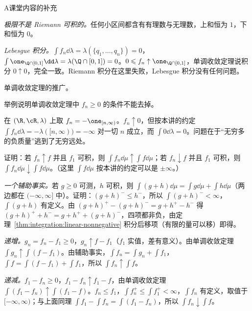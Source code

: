 \begin{exercises}{A}{课堂内容的补充}
\begin{solution}
\emph{极限不是 Riemann 可积的。}任何小区间都含有有理数与无理数，上和恒为 $1$，下和恒为 $0$。

\emph{Lebesgue 积分。}$\int f_n\dd\lambda=\lambda(\{q_1,\dots,q_n\})=0$，$\int\one_{\Q\cap[0,1]}\dd\lambda=\lambda(\Q\cap[0,1])=0$。$0\leqslant f_n\uparrow\one_{\Q\cap[0,1]}$，单调收敛定理说积分 $0\uparrow0$，完全一致。Riemann 积分在这里失败，Lebesgue 积分没有任何问题。
\end{solution}

\item\label{ex:integration:A5} 单调收敛定理的推广。
\begin{questions}
\item 举例说明单调收敛定理中 $f_n\geqslant0$ 的条件不能去掉。
\begin{solution}
在 $(\R,\cR,\lambda)$ 上取 $f_n=-\one_{[n,\infty)}$。$f_n\uparrow0$，但按本讲的约定 $\int f_n\dd\lambda=-\lambda([n,\infty))=-\infty$ 对一切 $n$ 成立，而 $\int0\dd\lambda=0$。问题在于“无穷多的负质量”逃到了无穷远处。
\end{solution}
\item 证明：若 $f_n\uparrow f$ 并且 $f_1$ 可积，则 $\int f_n\dd\mu\uparrow\int f\dd\mu$；若 $f_n\downarrow f$ 并且 $f_1$ 可积，则 $\int f_n\dd\mu\downarrow\int f\dd\mu$。（这里 $\int f\dd\mu$ 按本讲的约定可以是 $\pm\infty$。）
\begin{solution}
\emph{一个辅助事实。}若 $g\geqslant0$ 可测，$h$ 可积，则 $\int(g+h)\dd\mu=\int g\dd\mu+\int h\dd\mu$（两边都在 $(-\infty,\infty]$ 中）。证明：$(g+h)^-\leqslant h^-$，所以 $\int(g+h)^-<\infty$，$\int(g+h)$ 有定义。由 $(g+h)^+-(g+h)^-=g+h^+-h^-$ 得 $(g+h)^++h^-=g+h^++(g+h)^-$，四项都非负，由定理~\ref{thm:integration:linear-nonnegative} 积分后移项（有限的量可以移）即得。

\emph{递增。}$g_n=f_n-f_1\geqslant0$，$g_n\uparrow f-f_1$（$f_1$ 实值，差有意义）。由单调收敛定理 $\int g_n\uparrow\int(f-f_1)$。由辅助事实，$\int f_n=\int g_n+\int f_1$，$\int f=\int(f-f_1)+\int f_1$，所以 $\int f_n\uparrow\int f$。

\emph{递减。}$f_1-f_n\geqslant0$，$f_1-f_n\uparrow f_1-f$，由单调收敛定理 $\int(f_1-f_n)\uparrow\int(f_1-f)$。$f_n\leqslant f_1$，$\int f_n^+\leqslant\int f_1^+<\infty$，$\int f_n$ 有定义，取值于 $[-\infty,\infty)$；与上面同理 $\int f_1-\int f_n=\int(f_1-f_n)$，所以 $\int f_n\downarrow\int f$。
\end{solution}
\end{questions}


\end{exercises}

